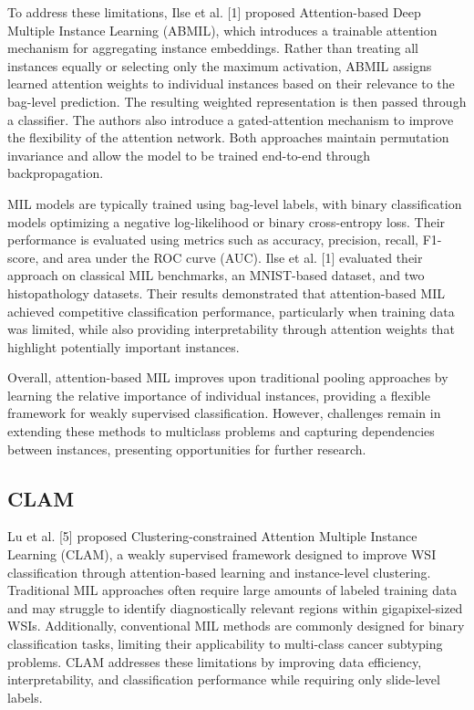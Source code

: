 \documentclass[journal]{IEEEtran}
\begin{document}
To address these limitations, Ilse et al. [1] proposed Attention-based Deep Multiple Instance Learning (ABMIL), which introduces a trainable attention mechanism for aggregating instance embeddings. Rather than treating all instances equally or selecting only the maximum activation, ABMIL assigns learned attention weights to individual instances based on their relevance to the bag-level prediction. The resulting weighted representation is then passed through a classifier. The authors also introduce a gated-attention mechanism to improve the flexibility of the attention network. Both approaches maintain permutation invariance and allow the model to be trained end-to-end through backpropagation.

MIL models are typically trained using bag-level labels, with binary classification models optimizing a negative log-likelihood or binary cross-entropy loss. Their performance is evaluated using metrics such as accuracy, precision, recall, F1-score, and area under the ROC curve (AUC). Ilse et al. [1] evaluated their approach on classical MIL benchmarks, an MNIST-based dataset, and two histopathology datasets. Their results demonstrated that attention-based MIL achieved competitive classification performance, particularly when training data was limited, while also providing interpretability through attention weights that highlight potentially important instances.

Overall, attention-based MIL improves upon traditional pooling approaches by learning the relative importance of individual instances, providing a flexible framework for weakly supervised classification. However, challenges remain in extending these methods to multiclass problems and capturing dependencies between instances, presenting opportunities for further research.

\subsection{CLAM}
Lu et al. [5] proposed Clustering-constrained Attention Multiple Instance Learning (CLAM), a weakly supervised framework designed to improve WSI classification through attention-based learning and instance-level clustering. Traditional MIL approaches often require large amounts of labeled training data and may struggle to identify diagnostically relevant regions within gigapixel-sized WSIs. Additionally, conventional MIL methods are commonly designed for binary classification tasks, limiting their applicability to multi-class cancer subtyping problems. CLAM addresses these limitations by improving data efficiency, interpretability, and classification performance while requiring only slide-level labels.
\end{document}
